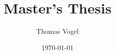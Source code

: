 \documentclass{article}
\begin{document}
\title{Master's Thesis}
\date{\today}
\author{Thomas Vogel}

\maketitle

%
%
%
%
%
\end{document}
